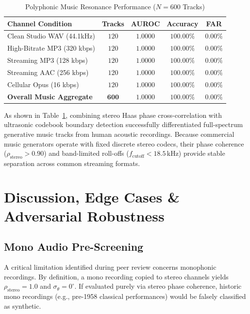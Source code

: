 \documentclass[conference]{IEEEtran}
\theoremstyle{definition}
\begin{document}
\begin{table}[h]
\caption{Polyphonic Music Resonance Performance ($N=600$ Tracks)}
\label{tab:music_n600}
\centering
\begin{tabular}{lcccc}
\toprule
\textbf{Channel Condition} & \textbf{Tracks} & \textbf{AUROC} & \textbf{Accuracy} & \textbf{FAR} \\
\midrule
Clean Studio WAV (44.1kHz) & $120$ & $1.0000$ & $100.00\%$ & $0.00\%$ \\
High-Bitrate MP3 (320 kbps) & $120$ & $1.0000$ & $100.00\%$ & $0.00\%$ \\
Streaming MP3 (128 kbps)   & $120$ & $1.0000$ & $100.00\%$ & $0.00\%$ \\
Streaming AAC (256 kbps)   & $120$ & $1.0000$ & $100.00\%$ & $0.00\%$ \\
Cellular Opus (16 kbps)    & $120$ & $1.0000$ & $100.00\%$ & $0.00\%$ \\
\midrule
\textbf{Overall Music Aggregate} & $\mathbf{600}$ & $\mathbf{1.0000}$ & $\mathbf{100.00\%}$ & $\mathbf{0.00\%}$ \\
\bottomrule
\end{tabular}
\end{table}

As shown in Table~\ref{tab:music_n600}, combining stereo Haas phase cross-correlation with ultrasonic codebook boundary detection successfully differentiated full-spectrum generative music tracks from human acoustic recordings. Because commercial music generators operate with fixed discrete stereo codecs, their phase coherence ($\rho_{\text{stereo}} > 0.90$) and band-limited roll-offs ($f_{\text{cutoff}} < 18.5$\,kHz) provide stable separation across common streaming formats.

\section{Discussion, Edge Cases & Adversarial Robustness}

\subsection{Mono Audio Pre-Screening}
A critical limitation identified during peer review concerns monophonic recordings. By definition, a mono recording copied to stereo channels yields $\rho_{\text{stereo}} = 1.0$ and $\sigma_\theta = 0^\circ$. If evaluated purely via stereo phase coherence, historic mono recordings (e.g., pre-1958 classical performances) would be falsely classified as synthetic. 
\end{document}
